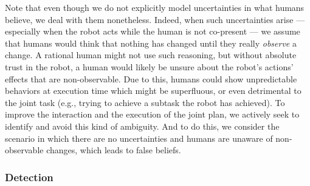 \documentclass[letterpaper]{article} %
\begin{document}
Note that even though we do not explicitly model uncertainties in what humans believe, we deal with them nonetheless. 
Indeed, when such uncertainties arise --- especially when the robot acts while the human is not co-present --- we assume that humans would think that nothing has changed until they really \textit{observe} a change. 
A rational human might not use such reasoning, but without absolute trust in the robot, a human would likely be unsure about the robot's actions' effects that are non-observable. 
Due to this, humans could show unpredictable behaviors at execution time which might be superfluous, or even detrimental to the joint task (e.g., trying to achieve a subtask the robot has achieved).
To improve the interaction and the execution of the joint plan, we actively seek to identify and avoid this kind of ambiguity. And to do this, we consider the scenario in which there are no uncertainties and humans are unaware of non-observable changes, which leads to false beliefs.

\subsubsection{Detection}


\end{document}
